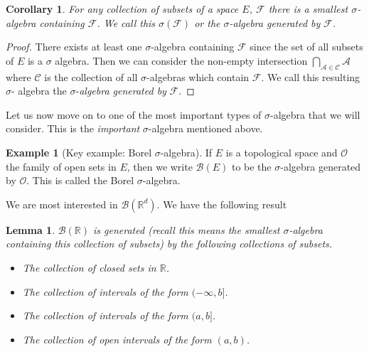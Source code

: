 \documentclass[
]{book}
\providecommand{\tightlist}{%
  \setlength{\itemsep}{0pt}\setlength{\parskip}{0pt}}
\newtheorem{lemma}{Lemma}[chapter]
\newtheorem{corollary}{Corollary}[chapter]
\theoremstyle{definition}
\theoremstyle{definition}
\newtheorem{example}{Example}[chapter]
\theoremstyle{definition}
\theoremstyle{definition}
\theoremstyle{remark}
\begin{document}
\begin{corollary}
For any collection of subsets of a space \(E\), \(\mathcal{F}\) there is a smallest \(\sigma\)-algebra containing \(\mathcal{F}\). We call this \(\sigma(\mathcal{F})\) or the \(\sigma\)-algebra generated by \(\mathcal{F}\).
\end{corollary}

\begin{proof}
There exists at least one \(\sigma\)-algebra containing \(\mathcal{F}\) since the set of all subsets of \(E\) is a \(\sigma\) algebra. Then we can consider the non-empty intersection \(\bigcap_{\mathcal{A} \in \mathcal{C}} \mathcal{A}\) where \(\mathcal{C}\) is the collection of all \(\sigma\)-algebras which contain \(\mathcal{F}\). We call this resulting \(\sigma\)- algebra the \(\sigma\)-\emph{algebra generated by} \(\mathcal{F}\).
\end{proof}

Let us now move on to one of the most important types of \(\sigma\)-algebra that we will consider. This is the \emph{important} \(\sigma\)-algebra mentioned above.

\begin{example}[Key example: Borel $\sigma$-algebra]
If \(E\) is a topological space and \(\mathcal{O}\) the family of open sets in \(E\), then we write \(\mathcal{B}(E)\) to be the \(\sigma\)-algebra generated by \(\mathcal{O}\). This is called the Borel \(\sigma\)-algebra.
\end{example}

We are most interested in \(\mathcal{B}(\mathbb{R}^d)\). We have the following result

\begin{lemma}

\(\mathcal{B}(\mathbb{R})\) is generated (recall this means the smallest \(\sigma\)-algebra containing this collection of subsets) by the following collections of subsets.

\begin{itemize}
\tightlist
\item
  The collection of closed sets in \(\mathbb{R}\).
\item
  The collection of intervals of the form \((-\infty, b]\).
\item
  The collection of intervals of the form \((a,b]\).
\item
  The collection of open intervals of the form \((a,b)\).
\end{itemize}

\end{lemma}
\end{document}
